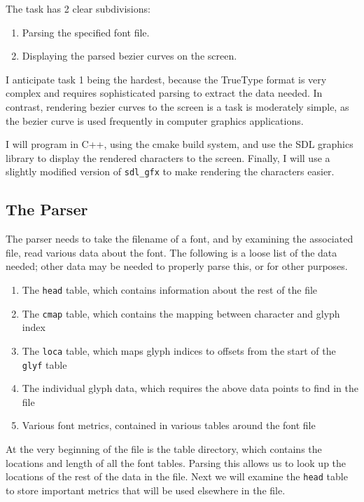 \documentclass{report}
\begin{document}
The task has 2 clear subdivisions:
\begin{enumerate}
\item{Parsing the specified font file.}
\item{Displaying the parsed bezier curves on the screen.}
\end{enumerate}


I anticipate task 1 being the hardest, because the TrueType format is very
complex and requires sophisticated parsing to extract the data needed. In
contrast, rendering bezier curves to the screen is a task is moderately simple,
as the bezier curve is used frequently in computer graphics applications.

I will program in C++, using the cmake build system, and use the SDL graphics
library to display the rendered characters to the screen. Finally, I will use a
slightly modified version of \texttt{sdl\_gfx} to make rendering the characters easier. 

\subsection{The Parser}
The parser needs to take the filename of a font, and by examining the associated
file, read various data about the font. The following is a loose list of the
data needed; other data may be needed to properly parse this, or for other
purposes.

\begin{enumerate}
  \item{The \texttt{head} table, which contains information about the rest of
      the file}
  \item{The \texttt{cmap} table, which contains the mapping between character
      and glyph index}
  \item{The \texttt{loca} table, which maps glyph indices to offsets from the
      start of the \texttt{glyf} table}
  \item{The individual glyph data, which requires the above data points to
      find in the file}
  \item{Various font metrics, contained in various tables around the font file}
\end{enumerate}

At the very beginning of the file is the table directory, which contains the
locations and length of all the font tables. Parsing this allows us to look up
the locations of the rest of the data in the file. Next we will examine the
\texttt{head} table to store important metrics that will be used elsewhere in
the file.
\end{document}
